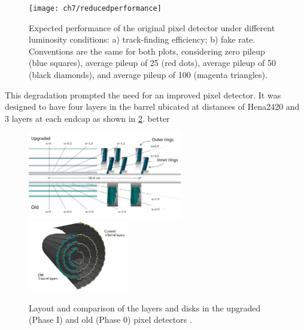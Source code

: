 \begin{figure}[!h]
\centering
\texttt{[image: ch7/reducedperformance]}
\caption[Expected performance of the original pixel detector for different luminosities.]{Expected performance of the original pixel detector under different luminosity conditions: a) track-finding efficiency; b) fake rate. Conventions are the same for both plots, considering zero pileup (blue squares), average pileup of 25 (red dots), average pileup of 50 (black diamonds), and average pileup of 100 (magenta triangles).\cite{pix_tdr}}\label{fig:red_perf}
\end{figure}

This degradation prompted the need for an improved pixel detector. It was designed to have four layers in the barrel ubicated at distances of Hena2420
and 3 layers at each endcap as shown in \ref{fig:new_pix}. better 

{}

{}

\begin{figure}[!h]
\centering
\includegraphics[width=0.6\textwidth]{../images/ch7/fpix.pdf}
\includegraphics[width=0.39\textwidth]{../images/ch7/bpix.pdf}
\caption[Layout of the upgraded and old pixel detectors.]{Layout and comparison of the layers and disks in the upgraded (Phase I) and old (Phase 0) pixel detectors \cite{pix_tdr}.}\label{fig:new_pix}
\end{figure}

